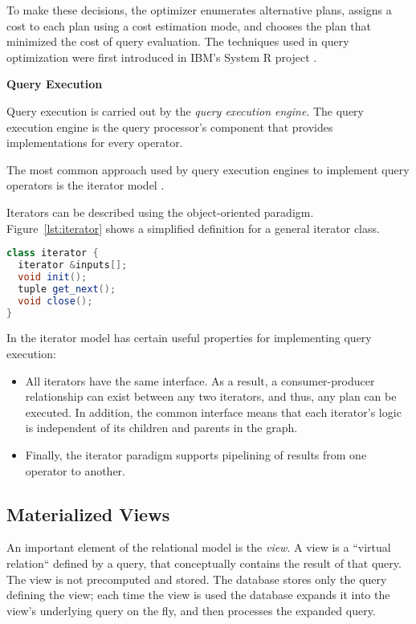 To make these decisions, the optimizer enumerates alternative plans,
assigns a cost to each plan using a cost estimation mode,
and chooses the plan that minimized the cost of query evaluation.
The techniques used in query optimization were first introduced in IBM's System R project \cite{selinger:systemr}.

\bigskip
\noindent
\textbf{Query Execution}

Query execution is carried out by the \textit{query execution engine}.
The query execution engine is the query processor's component that provides implementations for every operator.

The most common approach used by query execution engines to implement query operators is the iterator model
\cite{graefe:queryevaluation}.

Iterators can be described using the object-oriented paradigm.
Figure~\ref{lst:iterator} shows a simplified definition for a general iterator class.

\begin{lstlisting}[caption={Iterator class pseudocode \cite{hellerstein:databasearchitecture}},label={lst:iterator},captionpos=b,language=Java]
class iterator {
  iterator &inputs[];
  void init();
  tuple get_next();
  void close();
}
\end{lstlisting}

In the iterator model has certain useful properties for implementing query execution:
\begin{itemize}

  \item All iterators have the same interface.
  As a result, a consumer-producer relationship can exist between any two iterators, and thus, any plan can be executed.
  In addition, the common interface means that each iterator's logic is independent of its children and parents in the graph.

  \item Finally, the iterator paradigm supports pipelining of results from one operator to another.

\end{itemize}

\subsection{Materialized Views}

An important element of the relational model is the \textit{view}.
A view is a ``virtual relation`` defined by a query, that conceptually contains the result of that query.
The view is not precomputed and stored.
The database stores only the query defining the view;
each time the view is used the database expands it into the view’s underlying query on the fly,
and then processes the expanded query.

